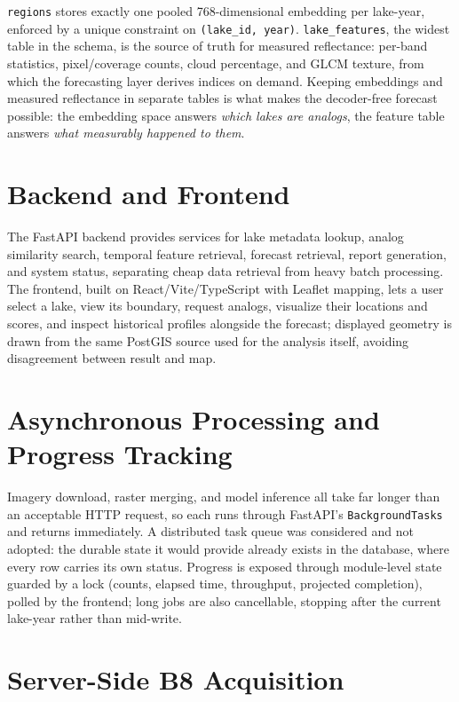 \documentclass[12pt,a4paper,oneside]{report}
\newcommand{\code}[1]{\texttt{#1}}
\begin{document}
\code{regions} stores exactly one pooled 768-dimensional embedding
per lake-year, enforced by a unique constraint on \code{(lake\_id,
year)}. \code{lake\_features}, the widest table in the schema, is
the source of truth for measured reflectance: per-band statistics,
pixel/coverage counts, cloud percentage, and GLCM texture, from
which the forecasting layer derives indices on demand. Keeping
embeddings and measured reflectance in separate tables is what makes
the decoder-free forecast possible: the embedding space answers
\emph{which lakes are analogs}, the feature table answers \emph{what
measurably happened to them}.

\section{Backend and Frontend}

The FastAPI backend provides services for lake metadata lookup,
analog similarity search, temporal feature retrieval, forecast
retrieval, report generation, and system status, separating cheap
data retrieval from heavy batch processing. The frontend, built on
React/Vite/TypeScript with Leaflet mapping, lets a user select a
lake, view its boundary, request analogs, visualize their locations
and scores, and inspect historical profiles alongside the forecast;
displayed geometry is drawn from the same PostGIS source used for
the analysis itself, avoiding disagreement between result and map.

\section{Asynchronous Processing and Progress Tracking}

Imagery download, raster merging, and model inference all take far
longer than an acceptable HTTP request, so each runs through
FastAPI's \code{BackgroundTasks} and returns immediately. A
distributed task queue was considered and not adopted: the durable
state it would provide already exists in the database, where every
row carries its own status. Progress is exposed through module-level
state guarded by a lock (counts, elapsed time, throughput, projected
completion), polled by the frontend; long jobs are also cancellable,
stopping after the current lake-year rather than mid-write.

\section{Server-Side B8 Acquisition}
\label{sec:b8}
\end{document}
